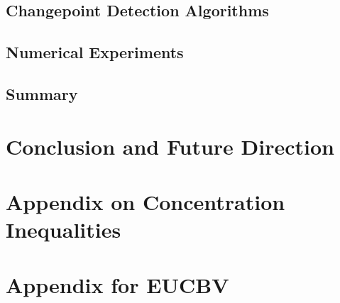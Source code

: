 \documentclass[MS]{iitmdiss}
\begin{document}
\section{Changepoint Detection Algorithms}
\label{psbandit:algorithm}



%


\section{Numerical Experiments}
\label{psbandit:expt}



\section{Summary}
\label{psbandit:conclusion}




\chapter{Conclusion and Future Direction}
\label{ThesisConc}



\appendix


\chapter{Appendix on Concentration Inequalities}
\label{sec:app:Conc}



\chapter{Appendix for EUCBV}
\label{sec:app:EUCBV}

\end{document}
